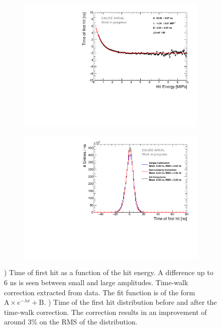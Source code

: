 \documentclass{JINST}
\begin{document}
\begin{figure}[htbp!]
  \begin{subfigure}[t]{0.49\textwidth}
    \centering
    \includegraphics[width=1\linewidth]{fig/TimeWalkProfile.pdf}
    \caption{} \label{fig:time_walk}
  \end{subfigure}
  \hfill
  \begin{subfigure}[t]{0.49\textwidth}
    \centering
    \includegraphics[width=1\linewidth]{fig/Timing_AHCAL_AllCorrection.pdf}
    \caption{} \label{fig:Timing_AllCorr}
  \end{subfigure}
  \caption{) Time of first hit as a function of the hit energy. A difference up to 6 ns is seen between small and large amplitudes. Time-walk correction extracted from data. The fit function is of the form $\text{A} \times e^{-\lambda{}x} + \text{B}$. ) Time of the first hit distribution before and after the time-walk correction. The correction results in an improvement of around 3\% on the RMS of the distribution.}
\end{figure}
\end{document}
